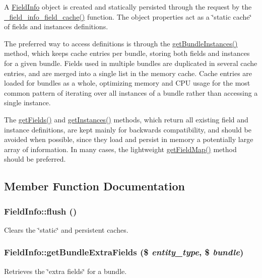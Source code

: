 A \hyperlink{classFieldInfo}{FieldInfo} object is created and statically persisted through the request by the \hyperlink{field_8info_8inc_ac916c03792bed928c8850585fbc0f433}{\_\-field\_\-info\_\-field\_\-cache()} function. The object properties act as a \char`\"{}static cache\char`\"{} of fields and instances definitions.

The preferred way to access definitions is through the \hyperlink{classFieldInfo_a86592a2d5a38d0212d1fe66a3d09f279}{getBundleInstances()} method, which keeps cache entries per bundle, storing both fields and instances for a given bundle. Fields used in multiple bundles are duplicated in several cache entries, and are merged into a single list in the memory cache. Cache entries are loaded for bundles as a whole, optimizing memory and CPU usage for the most common pattern of iterating over all instances of a bundle rather than accessing a single instance.

The \hyperlink{classFieldInfo_a5e817caa8f9c7fae505f9764ee676e0b}{getFields()} and \hyperlink{classFieldInfo_af3f374479203c6cafc6ec01655e0df76}{getInstances()} methods, which return all existing field and instance definitions, are kept mainly for backwards compatibility, and should be avoided when possible, since they load and persist in memory a potentially large array of information. In many cases, the lightweight \hyperlink{classFieldInfo_a626d055e692aad18ce67e2bc0dfa3b41}{getFieldMap()} method should be preferred. 

\subsection{Member Function Documentation}
\hypertarget{classFieldInfo_a54c9b362e943aa6d48f600f81bd8a22a}{
\subsubsection[{flush}]{\setlength{\rightskip}{0pt plus 5cm}FieldInfo::flush ()}}
\label{classFieldInfo_a54c9b362e943aa6d48f600f81bd8a22a}
Clears the \char`\"{}static\char`\"{} and persistent caches. \hypertarget{classFieldInfo_a7dac2449d18bf1481651f12e357fc36e}{
\subsubsection[{getBundleExtraFields}]{\setlength{\rightskip}{0pt plus 5cm}FieldInfo::getBundleExtraFields (\$ {\em entity\_\-type}, \/  \$ {\em bundle})}}
\label{classFieldInfo_a7dac2449d18bf1481651f12e357fc36e}
Retrieves the \char`\"{}extra fields\char`\"{} for a bundle.


